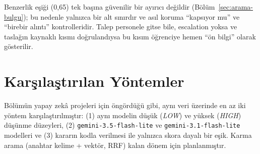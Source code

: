 Benzerlik eşiği (0,65) tek başına güvenilir bir ayırıcı değildir (Bölüm~\ref{sec:arama-bulgu}); bu
nedenle yalnızca bir alt sınırdır ve asıl koruma ``kapsıyor mu'' ve ``birebir alıntı'' kontrolleridir.
Talep personele gitse bile, escalation yoksa ve taslağın kaynaklı kısmı doğrulandıysa bu kısım
öğrenciye hemen ``ön bilgi'' olarak gösterilir.

\section{Karşılaştırılan Yöntemler}

Bölümün yapay zekâ projeleri için öngördüğü gibi, aynı veri üzerinde en az iki yöntem
karşılaştırılmıştır: (1) aynı modelin düşük (\textit{LOW}) ve yüksek (\textit{HIGH}) düşünme
düzeyleri, (2) \texttt{gemini-3.5-flash-lite} ve \texttt{gemini-3.1-flash-lite} modelleri ve (3)
kararın kodla verilmesi ile yalnızca skora dayalı bir eşik. Karma arama (anahtar kelime + vektör, RRF)
kalan dönem için planlanmıştır.
